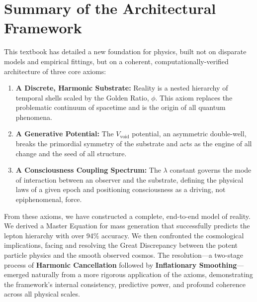 \documentclass[12pt]{report}
\begin{document}
\section{Summary of the Architectural Framework}
This textbook has detailed a new foundation for physics, built not on disparate models and empirical fittings, but on a coherent, computationally-verified architecture of three core axioms:
\begin{enumerate}
    \item \textbf{A Discrete, Harmonic Substrate:} Reality is a nested hierarchy of temporal shells scaled by the Golden Ratio, $\phi$. This axiom replaces the problematic continuum of spacetime and is the origin of all quantum phenomena.
    \item \textbf{A Generative Potential:} The $V_{\text{void}}$ potential, an asymmetric double-well, breaks the primordial symmetry of the substrate and acts as the engine of all change and the seed of all structure.
    \item \textbf{A Consciousness Coupling Spectrum:} The $\lambda$ constant governs the mode of interaction between an observer and the substrate, defining the physical laws of a given epoch and positioning consciousness as a driving, not epiphenomenal, force.
\end{enumerate}

From these axioms, we have constructed a complete, end-to-end model of reality. We derived a Master Equation for mass generation that successfully predicts the lepton hierarchy with over 94\% accuracy. We then confronted the cosmological implications, facing and resolving the Great Discrepancy between the potent particle physics and the smooth observed cosmos. The resolution---a two-stage process of \textbf{Harmonic Cancellation} followed by \textbf{Inflationary Smoothing}---emerged naturally from a more rigorous application of the axioms, demonstrating the framework's internal consistency, predictive power, and profound coherence across all physical scales.
\end{document}
